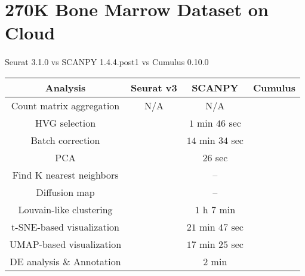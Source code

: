 \documentclass[10pt]{article}
\begin{document}
\section{270K Bone Marrow Dataset on Cloud}

\paragraph{}
Seurat 3.1.0 \qquad vs \qquad SCANPY 1.4.4.post1 \qquad vs \qquad Cumulus 0.10.0

\begin{table}[H]
	\centering
	\begin{tabular}{|c|c|c|c|}
		\hline
		Analysis & Seurat v3 & SCANPY & Cumulus\\
		\hline \hline
		Count matrix aggregation & N/A & N/A & \\
		\hline
		HVG selection &  & $1$ min $46$ sec  &  \\
		\hline
		Batch correction &  & $14$ min $34$ sec  &  \\
		\hline
		PCA &  & $26$ sec  &  \\
		\hline
		Find K nearest neighbors &   & --   & \\
		\hline
		Diffusion map &  & --  &  \\
		\hline
		Louvain-like clustering &  & $1$ h $7$ min  &  \\
		\hline
		t-SNE-based visualization &  & $21$ min $47$ sec  & \\
		\hline
		UMAP-based visualization &  & $17$ min $25$ sec   & \\
		\hline
		DE analysis \& Annotation & & $2$ min & \\
		\hline
	\end{tabular}
\end{table}
\end{document}
